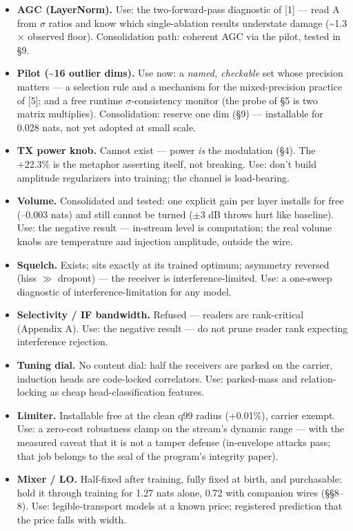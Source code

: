 \documentclass[10pt]{article}
\begin{document}
\begin{itemize}\setlength\itemsep{1pt}
\item \textbf{AGC (LayerNorm).} Use: the two-forward-pass diagnostic of [1] --- read A from $\sigma$ ratios and know which single-ablation results understate damage (\textasciitilde{}1.3$\times$ observed floor). Consolidation path: coherent AGC via the pilot, tested in §9.
\item \textbf{Pilot (\textasciitilde{}16 outlier dims).} Use now: a \emph{named, checkable} set whose precision matters --- a selection rule and a mechanism for the mixed-precision practice of [5]; and a free runtime $\sigma$-consistency monitor (the probe of §5 is two matrix multiplies). Consolidation: reserve one dim (§9) --- installable for 0.028 nats, not yet adopted at small scale.
\item \textbf{TX power knob.} Cannot exist --- power \emph{is} the modulation (§4). The +22.3\% is the metaphor asserting itself, not breaking. Use: don't build amplitude regularizers into training; the channel is load-bearing.
\item \textbf{Volume.} Consolidated and tested: one explicit gain per layer installs for free (--0.003 nats) and still cannot be turned ($\pm$3 dB throws hurt like baseline). Use: the negative result --- in-stream level is computation; the real volume knobs are temperature and injection amplitude, outside the wire.
\item \textbf{Squelch.} Exists; sits exactly at its trained optimum; asymmetry reversed (hiss $\gg$ dropout) --- the receiver is interference-limited. Use: a one-sweep diagnostic of interference-limitation for any model.
\item \textbf{Selectivity / IF bandwidth.} Refused --- readers are rank-critical (Appendix A). Use: the negative result --- do not prune reader rank expecting interference rejection.
\item \textbf{Tuning dial.} No content dial: half the receivers are parked on the carrier, induction heads are code-locked correlators. Use: parked-mass and relation-locking as cheap head-classification features.
\item \textbf{Limiter.} Installable free at the clean q99 radius (+0.01\%), carrier exempt. Use: a zero-cost robustness clamp on the stream's dynamic range --- with the measured caveat that it is not a tamper defense (in-envelope attacks pass; that job belongs to the seal of the program's integrity paper).
\item \textbf{Mixer / LO.} Half-fixed after training, fully fixed at birth, and purchasable: hold it through training for 1.27 nats alone, 0.72 with companion wires (§§8--8). Use: legible-transport models at a known price; registered prediction that the price falls with width.

\end{itemize}
\end{document}
